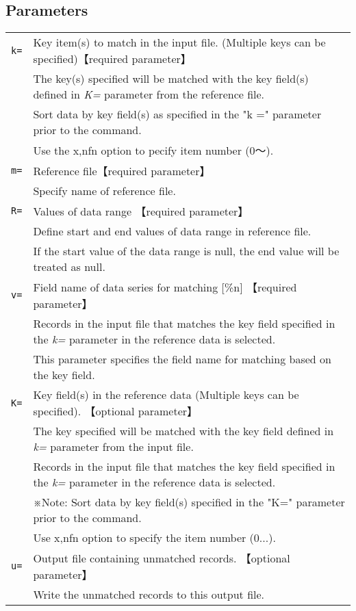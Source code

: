 \documentclass[a4paper]{jarticle}
\begin{document}
\subsection*{Parameters}
\begin{table}[htbp]
{\small
\begin{tabular}{ll}
\verb|k=|    & Key item(s) to match in the input file. (Multiple keys can be specified)【required parameter】\\
& The key(s) specified will be matched with the key field(s) defined in \emph{K=} parameter from the reference file. \\
& Sort data by key field(s) as specified in the "k =" parameter prior to the command.  \\
& Use the x,nfn option to pecify item number (0〜). \\

\verb|m=|    & Reference file【required parameter】\\
& Specify name of reference file. \\
\verb|R=|    & Values of data range 【required parameter】\\
& Define start and end values of data range in reference file. \\
& If the start value of the data range is null, the end value will be treated as null. \\
\verb|v=|    & Field name of data series for matching [\%{n}] 【required parameter】\\
&  Records in the input file that matches the key field specified in the \emph{k=} parameter in the reference data is selected.  \\
& This parameter specifies the field name for matching based on the key field.  \\
\verb|K=|    &  Key field(s) in the reference data (Multiple keys can be specified). 【optional parameter】\\
& The key specified will be matched with the key field defined in \emph{k=} parameter from the input file.  \\
& Records in the input file that matches the key field specified in the \emph{k=} parameter in the reference data is selected. \\
& ※Note: Sort data by key field(s) specified in the "K=" parameter prior to the command. \\
& Use x,nfn option to specify the item number (0...). \\
\verb|u=|    & Output file containing unmatched records. 【optional parameter】\\
&  Write the unmatched records to this output file.  \\
\end{tabular} 
}
\end{table} 
\end{document}
